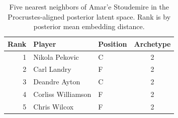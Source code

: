 \begin{table}[htbp]
  \centering\small
  \begin{tabular}{rllc}
    \toprule
    Rank & Player & Position & Archetype \\
    \midrule
    1 & Nikola Pekovic & C & 2 \\
    2 & Carl Landry & F & 2 \\
    3 & Deandre Ayton & C & 2 \\
    4 & Corliss Williamson & F & 2 \\
    5 & Chris Wilcox & F & 2 \\
    \bottomrule
  \end{tabular}
  \caption{Five nearest neighbors of Amar'e Stoudemire in the Procrustes-aligned posterior latent space. Rank is by posterior mean embedding distance.}
  \label{tab:Amar_e_Stoudemire_neighbors}
\end{table}


